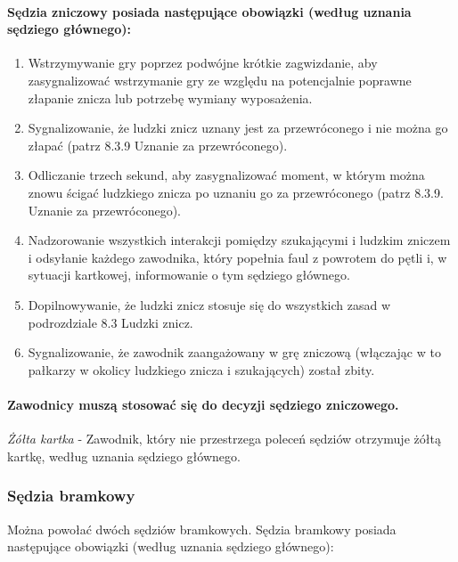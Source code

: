 \documentclass[12pt]{article}
\begin{document}
\paragraph{Sędzia zniczowy posiada następujące obowiązki (według
uznania sędziego głównego):}

\begin{enumerate}
\item Wstrzymywanie gry poprzez podwójne krótkie zagwizdanie, aby
zasygnalizować wstrzymanie gry ze względu na potencjalnie poprawne
złapanie znicza lub potrzebę wymiany wyposażenia.

\item Sygnalizowanie, że ludzki znicz uznany jest za przewróconego i nie
można go złapać (patrz 8.3.9 Uznanie za przewróconego).

\item Odliczanie trzech sekund, aby zasygnalizować moment, w którym można
znowu ścigać ludzkiego znicza po uznaniu go za przewróconego (patrz
8.3.9. Uznanie za przewróconego).

\item Nadzorowanie wszystkich interakcji pomiędzy szukającymi i ludzkim
zniczem i odsyłanie każdego zawodnika, który popełnia faul z powrotem do
pętli i, w sytuacji kartkowej, informowanie o tym sędziego głównego.

\item Dopilnowywanie, że ludzki znicz stosuje się do wszystkich zasad w
podrozdziale 8.3 Ludzki znicz.

\item Sygnalizowanie, że zawodnik zaangażowany w grę zniczową (włączając w
to pałkarzy w okolicy ludzkiego znicza i szukających) został zbity.
\end{enumerate}

\paragraph{Zawodnicy muszą stosować się do decyzji sędziego
zniczowego.}

\emph{Żółta kartka} - Zawodnik, który nie przestrzega poleceń sędziów
otrzymuje żółtą kartkę, według uznania sędziego głównego.

\subsubsection{Sędzia bramkowy}

Można powołać dwóch sędziów bramkowych. Sędzia bramkowy posiada
następujące obowiązki (według uznania sędziego głównego):
\end{document}
